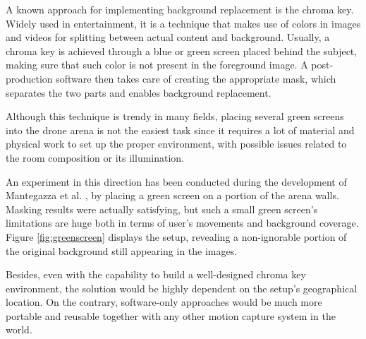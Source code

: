 A known approach for implementing background replacement is the chroma key. Widely used in entertainment, it is a technique that makes use of colors in images and videos for splitting between actual content and background. Usually, a chroma key is achieved through a blue or green screen placed behind the subject, making sure that such color is not present in the foreground image. A post-production software then takes care of creating the appropriate mask, which separates the two parts and enables background replacement.

Although this technique is trendy in many fields, placing several green screens into the drone arena is not the easiest task since it requires a lot of material and physical work to set up the proper environment, with possible issues related to the room composition or its illumination.

An experiment in this direction has been conducted during the development of Mantegazza et al. \cite{mantegazza2019visionbased}, by placing a green screen on a portion of the arena walls. Masking results were actually satisfying, but such a small green screen's limitations are huge both in terms of user's movements and background coverage. Figure \ref{fig:greenscreen} displays the setup, revealing a non-ignorable portion of the original background still appearing in the images.

Besides, even with the capability to build a well-designed chroma key environment, the solution would be highly dependent on the setup's geographical location. On the contrary, software-only approaches would be much more portable and reusable together with any other motion capture system in the world.

